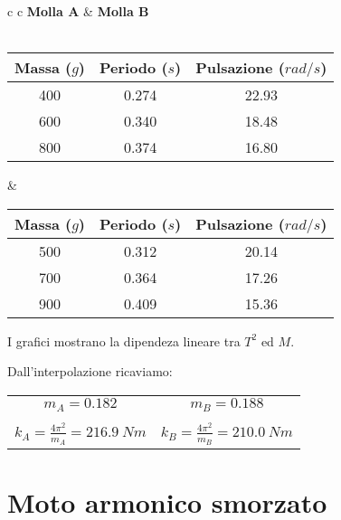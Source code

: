 \begin{center}

\begin{tabular}{c c}
\textbf{Molla A} & \hspace{2cm} \textbf{Molla B}\\
\\
\begin{tabular}{c | c| c}
Massa ($g$) & Periodo ($s$) & Pulsazione ($rad/s$)\\
\midrule
400 & 0.274 & 22.93\\
600 & 0.340 & 18.48\\
800 & 0.374 & 16.80\\
\end{tabular}

& \hspace{2cm}

\begin{tabular}{c | c | c}
Massa ($g$) & Periodo ($s$) & Pulsazione ($rad/s$)\\
\midrule
500 & 0.312 & 20.14\\
700 & 0.364 & 17.26\\
900 & 0.409 & 15.36\\
\end{tabular}

\end{tabular}

\end{center}

I grafici mostrano la dipendeza lineare tra $T^2$ ed $M$.


Dall'interpolazione ricaviamo:
\begin{center}
\begin{tabular}{c c}
$m_A=0.182$ & \hspace{3cm} $m_B=0.188$\\ 
\\
$k_A=\displaystyle{\frac{4\pi^2}{m_A}}=216.9\ Nm$ & \hspace{3cm} $k_B=\displaystyle{\frac{4\pi^2}{m_B}}=210.0\ Nm$ \\
\end{tabular}
\end{center}


\section{Moto armonico smorzato}

